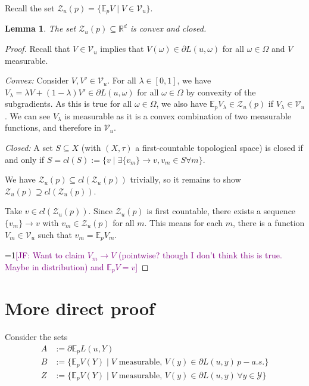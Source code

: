 \documentclass{article}
\newcommand{\Comments}{1}
\newcommand{\mynote}[2]{\ifnum\Comments=1\textcolor{#1}{#2}\fi}
\newcommand{\mytodo}[2]{\ifnum\Comments=1%
	\todo[linecolor=#1!80!black,backgroundcolor=#1,bordercolor=#1!80!black]{#2}\fi}
\newcommand{\jessie}[1]{\mynote{purple}{[JF: #1]}}
\newcommand{\jessiet}[1]{\mytodo{purple!20!white}{JF: #1}}
\newcommand{\reals}{\mathbb{R}}
\newcommand{\E}{\mathbb{E}}
\newcommand{\V}{\mathcal{V}}
\newcommand{\Y}{\mathcal{Y}}
\newcommand{\Z}{\mathcal{Z}}
\newtheorem{lemma}{Lemma}
\begin{document}
Recall the set $\Z_u(p) = \{\E_p V \mid V \in \V_u\}$.
\begin{lemma}
	The set $\Z_u(p) \subseteq \reals^d$ is convex and closed.
\end{lemma}
\begin{proof}
	Recall that $V \in \V_u$ implies that $V(\omega) \in \partial L(u,\omega)$ for all $\omega \in \Omega$ and $V$ measurable.
	
	\emph{Convex: }
	Consider $V, V' \in \V_u$.
	For all $\lambda \in [0,1]$, we have $V_\lambda = \lambda V + (1-\lambda) V' \in \partial L(u,\omega)$ for all $\omega \in \Omega$ by convexity of the subgradients.
	As this is true for all $\omega \in \Omega$, we also have $\E_p V_\lambda \in \Z_u(p)$ if $V_\lambda \in \V_u$.
	We can see $V_\lambda$ is measurable as it is a convex combination of two measurable functions, and therefore in $\V_u$.
	
	\emph{Closed: } A set $S \subseteq X$ (with $(X,\tau)$ a first-countable topological space) is closed if and only if $S = cl(S) := \{v \mid \exists \{v_m\} \to v, v_m \in S \forall m\}$.
	
	We have $\Z_u(p) \subseteq cl(\Z_u(p))$ trivially, so it remains to show $\Z_u(p) \supseteq cl(\Z_u(p))$.
	
	Take $v \in cl(\Z_u(p))$.
	Since $\Z_u(p)$ is first countable, there exists a sequence $\{v_m\} \to v$ with $v_m \in \Z_u(p)$ for all $m$.
	This means for each $m$, there is a function $V_m \in \V_u$ such that $v_m = \E_p V_m$.

	\jessie{Want to claim $V_m \to V$ (pointwise? though I don't think this is true.  Maybe in distribution) and $\E_p V = v$}	
	
\end{proof}

\section{More direct proof}
Consider the sets
\begin{align*}
A &:= \partial \E_p L(u,Y)\\
B &:= \{\E_p V(Y) \mid V\textrm{ measurable, } V(y) \in \partial L(u,y) \, p-a.s.\}\\
Z &:= \{\E_p V(Y) \mid V\textrm{ measurable, } V(y) \in \partial L(u,y) \, \forall y \in \Y \} 
\end{align*}
\end{document}
